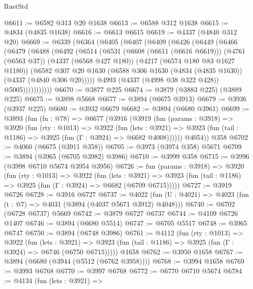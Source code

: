 \begin{lexlean}{RustStd}
\begin{coremodule}
@6611 := @6582 @313 @20 @1638
@6613 := @6588 @312 @1638
@6615 := @4834 (@4835 @1638)
@6616 := @6613 @6615
@6619 := @4337 (@4840 @312 @20)
@6669 := @6339
    (@6364
      (@6405
        (@6407
          (@6409
            (@6426
              (@6449
                (@6466
                  (@6479
                    (@6488
                      (@6492
                        (@6514
                          (@6531
                            (@6608 (@6611 (@6616 @6619)))
                            (@4761 (@6563 @37))
                            (@4337 (@6568 @427 @180))
                            (@4217 (@6574 @180 @83 @1627 @1180))
                            (@6582
                              @307
                              @20
                              @1630
                              (@6588 @306 @1630 (@4834 (@4835 @1630)) (@4337 (@4840 @306 @20)))))
                          @4993
                          (@4337 (@4998 @38 @322 @428))
                          @5005)))))))))))
@6670 := @3877 @225
@6674 := @3879 (@3883 @225) (@3889 @225)
@6675 := @3898 @5668
@6677 := @3894 (@6675 @3913)
@6679 := @3936 (@3937 @225)
@6680 := @3932 @6679
@6682 := @3894 (@6680 @3961)
@6699 := @3893
    (fun (fn : @78) =>
    @6677
      (@3916
        (@3919
          (fun (params : @3918) =>
          @3920
            (fun (rty : @1013) =>
            @3922
              (fun (lets : @3921) =>
              @3923 (fun (tail : @1186) => @3925 (fun (Γ : @3924) => @6682 @4008))))))
        @4054))
    @358
@6702 := @4060 (@6675 (@3911 @358))
@6705 := @3973 (@3974 @358) @5671
@6709 := @3894 (@3965 (@6705 @3982) @3986)
@6710 := @3999 @358
@6715 := @3996 (@3998 @6710 @5674 @3954 @3956)
@6726 := fun (params : @3918) =>
  @3920
    (fun (rty : @1013) =>
    @3922
      (fun (lets : @3921) =>
      @3923 (fun (tail : @1186) => @3925 (fun (Γ : @3924) => @6682 (@6709 @6715)))))
@6727 := @3919 @6726
@6728 := @3916 @6727
@6737 := @4022 (fun (U : @4021) => @4023 (fun (t : @7) => @4031 (@3894 (@4037 @5671 @3912) @4048)))
@6740 := @6702 (@6728 @6737) @5669
@6742 := @3879 @6727 @6737
@6744 := @4109 @6726 @1407
@6746 := @3894 (@6680 @5514)
@6747 := @6705 @5517
@6748 := @3965 @6747
@6750 := @3894 (@6748 @3986)
@6761 := @4112
    (fun (rty : @1013) =>
    @3922
      (fun (lets : @3921) =>
      @3923 (fun (tail : @1186) => @3925 (fun (Γ : @3924) => @6746 (@6750 @6715)))))
    @1658
@6762 := @3950 @1658
@6767 := @3894 (@6680 (@3944 (@5512 (@6762 @3958))))
@6768 := @3994 @1658
@6769 := @3993 @6768
@6770 := @3997 @6768
@6772 := @6770 @6710 @5674
@6784 := @4134
    (fun (lets : @3921) =>

\end{coremodule}
\end{lexlean}
